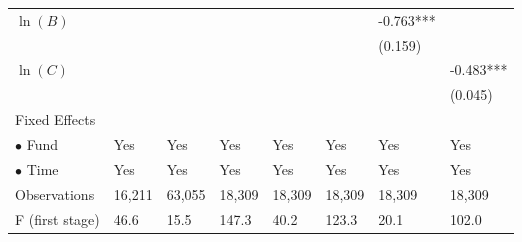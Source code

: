 \documentclass[openany]{book}
\theoremstyle{definition}
\theoremstyle{definition}
\theoremstyle{definition}
\theoremstyle{remark}
\begin{document}
\begin{table}[ht]
\begin{tabularx}{0.975\textwidth}{lYYYYYYY}
  $\ln(B)$ &  &  &  &  &  & -0.763*** &  \\ 
   &  &  &  &  &  & (0.159) &  \\ 
  $\ln(C)$ &  &  &  &  &  &  & -0.483*** \\ 
   &  &  &  &  &  &  & (0.045) \\ 
  Fixed Effects &  &  &  &  &  &  &  \\ 
  $\bullet$ Fund & Yes & Yes & Yes & Yes & Yes & Yes & Yes \\ 
  $\bullet$ Time & Yes & Yes & Yes & Yes & Yes & Yes & Yes \\ 
  Observations & 16,211 & 63,055 & 18,309 & 18,309 & 18,309 & 18,309 & 18,309 \\ 
  F (first stage) & 46.6 & 15.5 & 147.3 & 40.2 & 123.3 & 20.1 & 102.0 \\ 
   \bottomrule
\end{tabularx}
\endgroup
\end{table}


\end{document}
